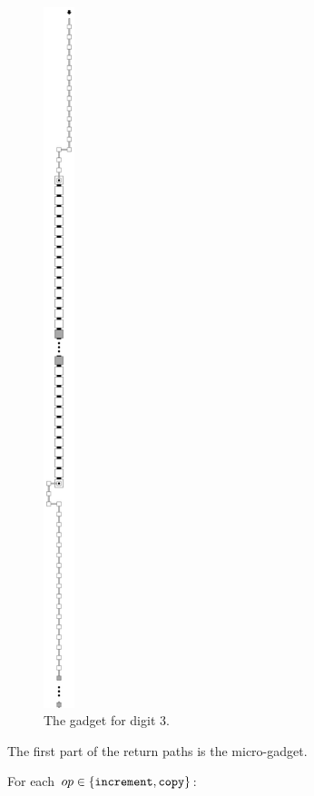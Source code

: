 \begin{figure}[H]
    \centering
    \includegraphics[width=0.08\textwidth]{return_paths_return_from_digit_3}
    \caption{\label{fig:return_from_digit_3} The {\returnfromdigit} gadget for digit 3.}
\end{figure}


The first part of the return paths is the {\returnfromdigit} micro-gadget.

For each $op\in \{ {\tt increment}, {\tt copy} \}$:

